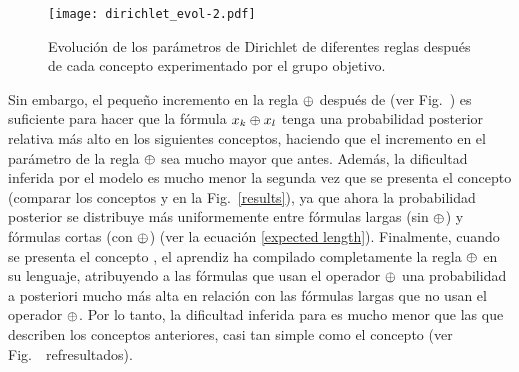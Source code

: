 \begin{figure}
        \centering
        \texttt{[image: dirichlet\_evol-2.pdf]}
        \caption{
        Evolución de los parámetros de Dirichlet de diferentes reglas después de cada concepto experimentado por el grupo objetivo.
        }
       \label{evol}
\end{figure}


Sin embargo, el pequeño incremento en la regla $ \oplus $ después de \targetb (ver Fig.~) es suficiente para hacer que la fórmula $x_ {k} \oplus x_{l} $ tenga una probabilidad posterior relativa más alto en los siguientes conceptos, haciendo que el incremento en el parámetro de la regla $ \oplus $ sea mucho mayor que antes. Además, la dificultad inferida por el modelo es mucho menor la segunda vez que se presenta el concepto (comparar los conceptos \targetd y \targetb en la Fig.~\ref{results}), ya que ahora la probabilidad posterior se distribuye más uniformemente entre fórmulas largas (sin $ \oplus $) y fórmulas cortas (con $ \oplus $) (ver la ecuación \eqref{expected length}). Finalmente, cuando se presenta el concepto \testa, el aprendiz ha compilado completamente la regla $ \oplus $ en su lenguaje, atribuyendo a las fórmulas que usan el operador $ \oplus $ una probabilidad a posteriori mucho más alta en relación con las fórmulas largas que no usan el operador $ \oplus $. Por lo tanto, la dificultad inferida para \testa es mucho menor que las que describen los conceptos anteriores, casi tan simple como el concepto \targeta (ver Fig.~\ ref{resultados}).

